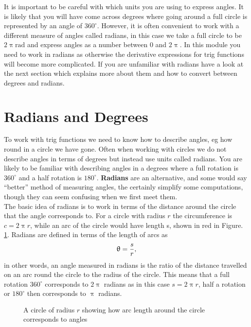 It is important to be careful with which units you are using to express angles. It is likely that you will have come across degrees where going around a full circle is represented by an angle of $360^{\circ}$. However, it is often convenient to work with a different measure of angles called radians, in this case we take a full circle to be $2\uppi\text{rad}$ and express angles as a number between $0$ and $2\uppi$. In this module you need to work in radians as otherwise the derivative expressions for trig functions will become more complicated. If you are unfamiliar with  radians have a look at the next section which explains more about them and how to convert between degrees and radians.

\section{Radians and Degrees}
To work with trig functions  we need to know how to describe angles, eg how round in a circle we have gone. Often when working with circles we do not describe angles in terms of degrees but instead use units called radians.  You are likely to be familiar with describing angles in a degrees where a full rotation is $360^{\circ}$ and a half rotation is $180^{\circ}$. \textbf{Radians} are an alternative, and some would say ``better'' method of measuring angles, the certainly simplify some computations, though they can seem confusing when we first meet them.\\

The basic idea of radians is to work in terms of the distance around the circle that the angle corresponds to.  For a circle with radius $r$ the circumference is $c=2\uppi r$, while an arc of the circle would have length s, shown in red in Figure. \ref{fig: radians}. Radians are defined in terms of the length of arcs as
\begin{equation}
\uptheta =\frac{s}{r},
\label{eq: definition of radians}
\end{equation}
in other words, an angle measured in radians is the ratio of the distance travelled on an arc round the circle to the radius of the circle. 
This means that a full rotation $360^{\circ}$ corresponds to $2\uppi$ radians as in this case $s=2\uppi r$, half a rotation or $180^{\circ}$ then corresponds to $\uppi$ radians. 

\begin{figure}[ht]
    \centering
    \caption{A circle of radius $r$ showing how arc length around the circle corresponds to angles}
        \label{fig: radians}
\end{figure}

